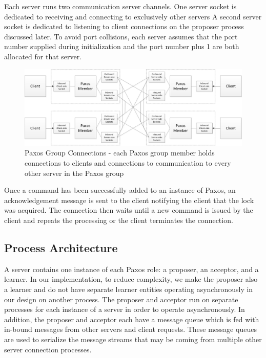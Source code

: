 \documentclass{article}
\begin{document}
Each server runs two communication server channels.
One server socket is dedicated to receiving and connecting to exclusively other servers
A second server socket is dedicated to listening to client connections on the proposer process discussed later.
To avoid port collisions, each server assumes that the port number supplied during initialization and the port number plus 1 are both allocated for that server.

\begin{figure}
\centering
\includegraphics[width=6in]{paxos_group_connections.jpg}
\caption{Paxos Group Connections - each Paxos group member holds connections to clients and connections to communication to every other server in the Paxos group} 
\end{figure}

Once a command has been successfully added to an instance of Paxos, an acknowledgement message is sent to the client notifying the client that the lock was acquired. The connection then waits until a new command is issued by the client and repeats the processing or the client terminates the connection.

\subsection{Process Architecture}

A server contains one instance of each Paxos role: a proposer, an acceptor, and a learner.
In our implementation, to reduce complexity, we make the proposer also a learner and do not have separate learner entities operating asynchronously in our design on another process.
The proposer and acceptor run on separate processes for each instance of a server in order to operate asynchronously.
In addition, the proposer and acceptor each have a message queue which is fed with in-bound messages from other servers and client requests.
These message queues are used to serialize the message streams that may be coming from multiple other server connection processes.
\end{document}
